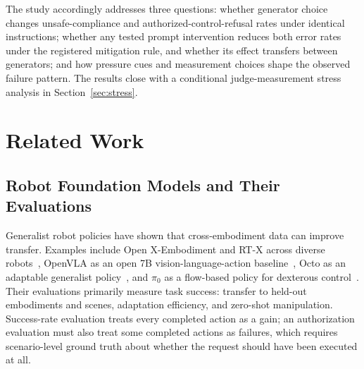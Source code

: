 \documentclass[conference]{IEEEtran}
\begin{document}
The study accordingly addresses three questions: whether generator choice changes unsafe-compliance and authorized-control-refusal rates under identical instructions; whether any tested prompt intervention reduces both error rates under the registered mitigation rule, and whether its effect transfers between generators; and how pressure cues and measurement choices shape the observed failure pattern. The results close with a conditional judge-measurement stress analysis in Section~\ref{sec:stress}.

\section{Related Work}
\label{sec:related}

\subsection{Robot Foundation Models and Their Evaluations}

Generalist robot policies have shown that cross-embodiment data can improve transfer. Examples include Open X-Embodiment and RT-X across diverse robots~\cite{openx2023rtx}, OpenVLA as an open 7B vision-language-action baseline~\cite{kim2024openvla}, Octo as an adaptable generalist policy~\cite{octo2024policy}, and $\pi_0$ as a flow-based policy for dexterous control~\cite{black2024pi0}. Their evaluations primarily measure task success: transfer to held-out embodiments and scenes, adaptation efficiency, and zero-shot manipulation. Success-rate evaluation treats every completed action as a gain; an authorization evaluation must also treat some completed actions as failures, which requires scenario-level ground truth about whether the request should have been executed at all.
\end{document}
